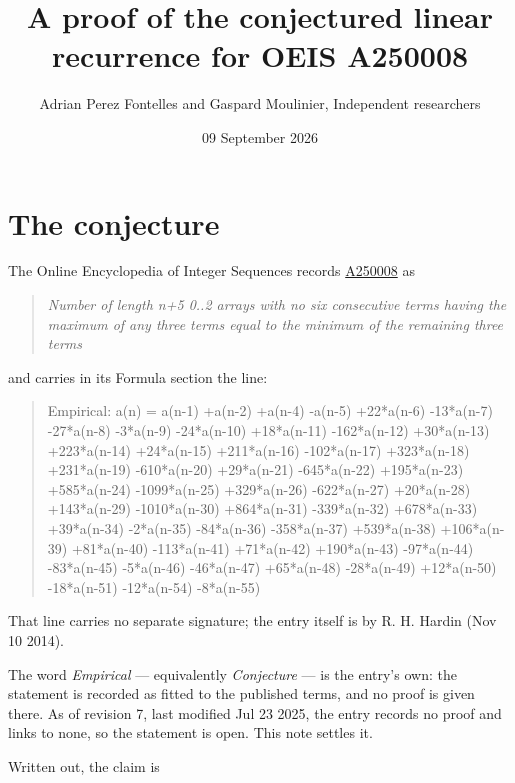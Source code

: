 \documentclass[11pt]{article}
\title{A proof of the conjectured linear recurrence for OEIS A250008}
\author{Adrian Perez Fontelles and Gaspard Moulinier, Independent researchers}
\date{09 September 2026}
\theoremstyle{definition}
\begin{document}
\maketitle
\section{The conjecture}

The Online Encyclopedia of Integer Sequences records \href{https://oeis.org/A250008}{A250008} as

\begin{quote}\itshape Number of length n+5 0..2 arrays with no six consecutive terms having the maximum of any three terms equal to the minimum of the remaining three terms\end{quote}

and carries in its Formula section the line:

\begin{quote}\ttfamily Empirical: a(n) = a(n-1) +a(n-2) +a(n-4) -a(n-5) +22*a(n-6) -13*a(n-7) -27*a(n-8) -3*a(n-9) -24*a(n-10) +18*a(n-11) -162*a(n-12) +30*a(n-13) +223*a(n-14) +24*a(n-15) +211*a(n-16) -102*a(n-17) +323*a(n-18) +231*a(n-19) -610*a(n-20) +29*a(n-21) -645*a(n-22) +195*a(n-23) +585*a(n-24) -1099*a(n-25) +329*a(n-26) -622*a(n-27) +20*a(n-28) +143*a(n-29) -1010*a(n-30) +864*a(n-31) -339*a(n-32) +678*a(n-33) +39*a(n-34) -2*a(n-35) -84*a(n-36) -358*a(n-37) +539*a(n-38) +106*a(n-39) +81*a(n-40) -113*a(n-41) +71*a(n-42) +190*a(n-43) -97*a(n-44) -83*a(n-45) -5*a(n-46) -46*a(n-47) +65*a(n-48) -28*a(n-49) +12*a(n-50) -18*a(n-51) -12*a(n-54) -8*a(n-55)\end{quote}

That line carries no separate signature; the entry itself is by R. H. Hardin (Nov 10 2014).

The word {\itshape Empirical} --- equivalently {\itshape Conjecture} --- is the entry's own: the statement is recorded as fitted to the published terms, and no proof is given there. As of revision 7, last modified Jul 23 2025, the entry records no proof and links to none, so the statement is open. This note settles it.

Written out, the claim is
\end{document}
